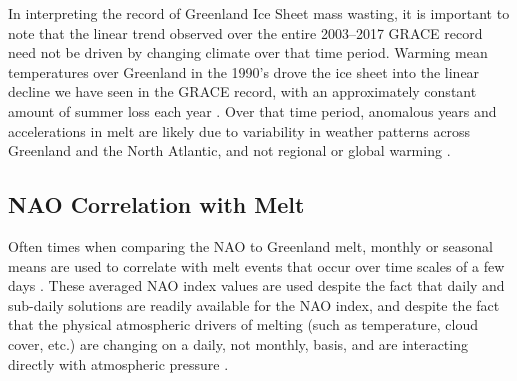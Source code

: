 \documentclass[11pt]{report}
\begin{document}
In interpreting the record of Greenland Ice Sheet mass wasting, it is important to note that the linear trend observed over the entire 2003--2017 GRACE record need not be driven by changing climate over that time period. Warming mean temperatures over Greenland in the 1990's drove the ice sheet into the linear decline we have seen in the GRACE record, with an approximately constant amount of summer loss each year \cite[][]{getraerFall}. Over that time period, anomalous years and accelerations in melt are likely due to variability in weather patterns across Greenland and the North Atlantic, and not regional or global warming \cite[][]{bevis2019,hahn2018}.


\begin{figure}[h]
\centering
{}
\caption[]{} \label{fig:Tslope}
\end{figure}

\subsection{NAO Correlation with Melt}
Often times when comparing the NAO to Greenland melt, monthly or seasonal means are used to correlate with melt events that occur over time scales of a few days \cite[see, for example, ][]{mattingly2018, bevis2019, angelen2014}. These averaged NAO index values are used despite the fact that daily and sub-daily solutions are readily available for the NAO index, and despite the fact that the physical atmospheric drivers of melting (such as temperature, cloud cover, etc.) are changing on a daily, not monthly, basis, and are interacting directly with atmospheric pressure \cite[for example,][]{mattingly2018}. 



\clearpage




\small
\renewcommand{\bibsep}{0em}

\renewcommand{\bibname}{References}


\end{document}
